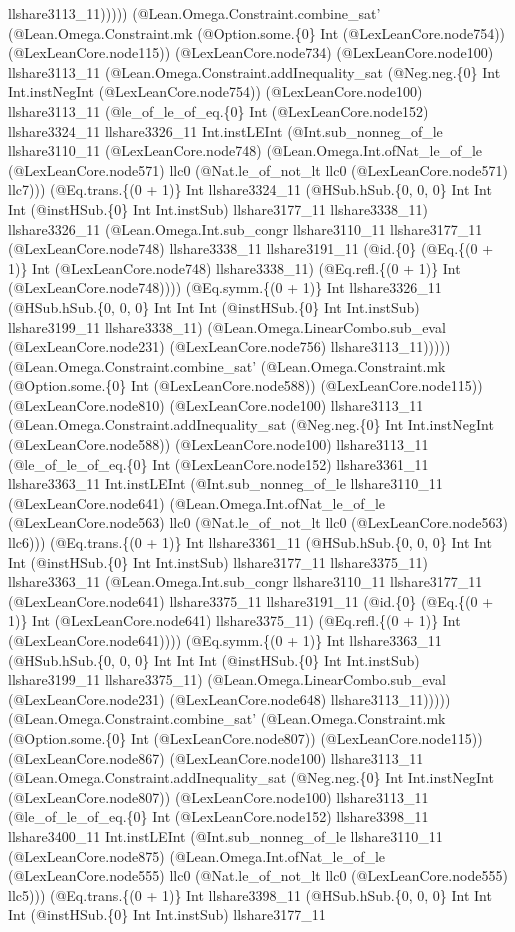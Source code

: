 \documentclass[11pt]{article}
\begin{document}
llshare3113\_11))))) (@Lean.Omega.Constraint.combine\_sat' (@Lean.Omega.Constraint.mk (@Option.some.\{0\} Int (@LexLeanCore.node754)) (@LexLeanCore.node115)) (@LexLeanCore.node734) (@LexLeanCore.node100) llshare3113\_11 (@Lean.Omega.Constraint.addInequality\_sat (@Neg.neg.\{0\} Int Int.instNegInt (@LexLeanCore.node754)) (@LexLeanCore.node100) llshare3113\_11 (@le\_of\_le\_of\_eq.\{0\} Int (@LexLeanCore.node152) llshare3324\_11 llshare3326\_11 Int.instLEInt (@Int.sub\_nonneg\_of\_le llshare3110\_11 (@LexLeanCore.node748) (@Lean.Omega.Int.ofNat\_le\_of\_le (@LexLeanCore.node571) llc0 (@Nat.le\_of\_not\_lt llc0 (@LexLeanCore.node571) llc7))) (@Eq.trans.\{(0 + 1)\} Int llshare3324\_11 (@HSub.hSub.\{0, 0, 0\} Int Int Int (@instHSub.\{0\} Int Int.instSub) llshare3177\_11 llshare3338\_11) llshare3326\_11 (@Lean.Omega.Int.sub\_congr llshare3110\_11 llshare3177\_11 (@LexLeanCore.node748) llshare3338\_11 llshare3191\_11 (@id.\{0\} (@Eq.\{(0 + 1)\} Int (@LexLeanCore.node748) llshare3338\_11) (@Eq.refl.\{(0 + 1)\} Int (@LexLeanCore.node748)))) (@Eq.symm.\{(0 + 1)\} Int llshare3326\_11 (@HSub.hSub.\{0, 0, 0\} Int Int Int (@instHSub.\{0\} Int Int.instSub) llshare3199\_11 llshare3338\_11) (@Lean.Omega.LinearCombo.sub\_eval (@LexLeanCore.node231) (@LexLeanCore.node756) llshare3113\_11))))) (@Lean.Omega.Constraint.combine\_sat' (@Lean.Omega.Constraint.mk (@Option.some.\{0\} Int (@LexLeanCore.node588)) (@LexLeanCore.node115)) (@LexLeanCore.node810) (@LexLeanCore.node100) llshare3113\_11 (@Lean.Omega.Constraint.addInequality\_sat (@Neg.neg.\{0\} Int Int.instNegInt (@LexLeanCore.node588)) (@LexLeanCore.node100) llshare3113\_11 (@le\_of\_le\_of\_eq.\{0\} Int (@LexLeanCore.node152) llshare3361\_11 llshare3363\_11 Int.instLEInt (@Int.sub\_nonneg\_of\_le llshare3110\_11 (@LexLeanCore.node641) (@Lean.Omega.Int.ofNat\_le\_of\_le (@LexLeanCore.node563) llc0 (@Nat.le\_of\_not\_lt llc0 (@LexLeanCore.node563) llc6))) (@Eq.trans.\{(0 + 1)\} Int llshare3361\_11 (@HSub.hSub.\{0, 0, 0\} Int Int Int (@instHSub.\{0\} Int Int.instSub) llshare3177\_11 llshare3375\_11) llshare3363\_11 (@Lean.Omega.Int.sub\_congr llshare3110\_11 llshare3177\_11 (@LexLeanCore.node641) llshare3375\_11 llshare3191\_11 (@id.\{0\} (@Eq.\{(0 + 1)\} Int (@LexLeanCore.node641) llshare3375\_11) (@Eq.refl.\{(0 + 1)\} Int (@LexLeanCore.node641)))) (@Eq.symm.\{(0 + 1)\} Int llshare3363\_11 (@HSub.hSub.\{0, 0, 0\} Int Int Int (@instHSub.\{0\} Int Int.instSub) llshare3199\_11 llshare3375\_11) (@Lean.Omega.LinearCombo.sub\_eval (@LexLeanCore.node231) (@LexLeanCore.node648) llshare3113\_11))))) (@Lean.Omega.Constraint.combine\_sat' (@Lean.Omega.Constraint.mk (@Option.some.\{0\} Int (@LexLeanCore.node807)) (@LexLeanCore.node115)) (@LexLeanCore.node867) (@LexLeanCore.node100) llshare3113\_11 (@Lean.Omega.Constraint.addInequality\_sat (@Neg.neg.\{0\} Int Int.instNegInt (@LexLeanCore.node807)) (@LexLeanCore.node100) llshare3113\_11 (@le\_of\_le\_of\_eq.\{0\} Int (@LexLeanCore.node152) llshare3398\_11 llshare3400\_11 Int.instLEInt (@Int.sub\_nonneg\_of\_le llshare3110\_11 (@LexLeanCore.node875) (@Lean.Omega.Int.ofNat\_le\_of\_le (@LexLeanCore.node555) llc0 (@Nat.le\_of\_not\_lt llc0 (@LexLeanCore.node555) llc5))) (@Eq.trans.\{(0 + 1)\} Int llshare3398\_11 (@HSub.hSub.\{0, 0, 0\} Int Int Int (@instHSub.\{0\} Int Int.instSub) llshare3177\_11 
\end{document}
